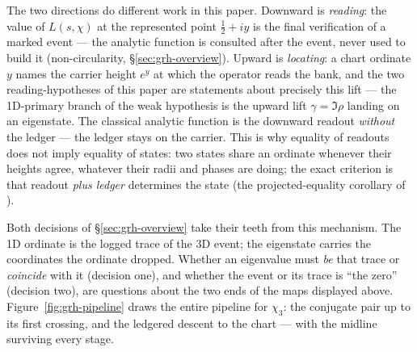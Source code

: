 \documentclass[11pt]{article}
\theoremstyle{definition}
\begin{document}
The two directions do different work in this paper. Downward is
\emph{reading}: the value of \(L(s,\chi)\) at the represented point
\(\tfrac12+iy\) is the final verification of a marked event --- the analytic
function is consulted after the event, never used to build it
(non-circularity, \S\ref{sec:grh-overview}). Upward is \emph{locating}: a
chart ordinate \(y\) names the carrier height \(e^{y}\) at which the operator
reads the bank, and the two reading-hypotheses of this paper are statements
about precisely this lift --- the 1D-primary branch of the weak hypothesis is
the upward lift \(\gamma=\Im\rho\) landing on an eigenstate. The classical
analytic function is the downward readout \emph{without} the ledger --- the
ledger stays on the carrier. This is why equality of readouts does not imply
equality of states: two states share an ordinate whenever their heights
agree, whatever their radii and phases are doing; the exact criterion is that
readout \emph{plus ledger} determines the state
(the projected-equality corollary of \cite{UniversalCarrier}).

Both decisions of \S\ref{sec:grh-overview} take their teeth from this
mechanism. The 1D ordinate is the logged trace of the 3D event; the
eigenstate carries the coordinates the ordinate dropped. Whether an
eigenvalue must \emph{be} that trace or \emph{coincide} with it (decision
one), and whether the event or its trace is ``the zero'' (decision two), are
questions about the two ends of the maps displayed above.
Figure~\ref{fig:grh-pipeline} draws the entire pipeline for \(\chi_3\): the
conjugate pair up to its first crossing, and the ledgered descent to the
chart --- with the midline surviving every stage.
\end{document}
